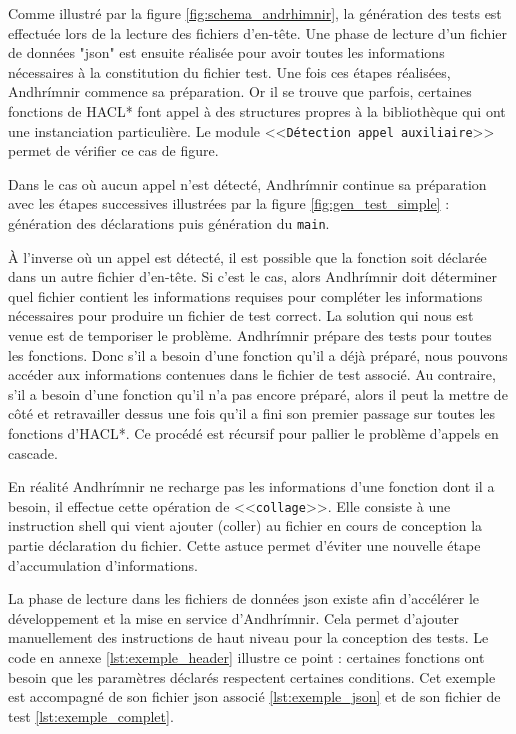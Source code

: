 Comme illustré par la figure \ref{fig:schema_andrhimnir}, la génération des tests est effectuée lors de la lecture des fichiers d'en-tête. Une phase de lecture d'un fichier de données "json" est ensuite réalisée pour avoir toutes les informations nécessaires à la constitution du fichier test. Une fois ces étapes réalisées, Andhrímnir commence sa préparation. Or il se trouve que parfois, certaines fonctions de HACL* font appel à des structures propres à la bibliothèque qui ont une instanciation particulière. Le module <<\texttt{Détection appel auxiliaire}>> permet de vérifier ce cas de figure.\smallbreak

Dans le cas où aucun appel n'est détecté, Andhrímnir continue sa préparation avec les étapes successives illustrées par la figure \ref{fig:gen_test_simple} : génération des déclarations puis génération du \texttt{main}.\smallbreak

À l'inverse où un appel est détecté, il est possible que la fonction soit déclarée dans un autre fichier d'en-tête. Si c'est le cas, alors Andhrímnir doit déterminer quel fichier contient les informations requises pour compléter les informations nécessaires pour produire un fichier de test correct. La solution qui nous est venue est de temporiser le problème. Andhrímnir prépare des tests pour toutes les fonctions. Donc s'il a besoin d'une fonction qu'il a déjà préparé, nous pouvons accéder aux informations contenues dans le fichier de test associé. Au contraire, s'il a besoin d'une fonction qu'il n'a pas encore préparé, alors il peut la mettre de côté et retravailler dessus une fois qu'il a fini son premier passage sur toutes les fonctions d'HACL*. Ce procédé est récursif pour pallier le problème d'appels en cascade.\smallbreak

En réalité Andhrímnir ne recharge pas les informations d'une fonction dont il a besoin, il effectue cette opération de <<\texttt{collage}>>. Elle consiste à une instruction shell qui vient ajouter (coller) au fichier en cours de conception la partie déclaration du fichier. Cette astuce permet d'éviter une nouvelle étape d'accumulation d'informations.\medbreak

La phase de lecture dans les fichiers de données json existe afin d'accélérer le développement et la mise en service d'Andhrímnir. Cela permet d'ajouter manuellement des instructions de haut niveau pour la conception des tests. Le code en annexe \ref{lst:exemple_header} illustre ce point : certaines fonctions ont besoin que les paramètres déclarés respectent certaines conditions. Cet exemple est accompagné de son fichier json associé \ref{lst:exemple_json} et de son fichier de test \ref{lst:exemple_complet}.  


